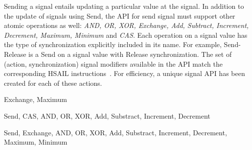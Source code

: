 \documentclass[draft]{book}
\begin{document}
Sending a signal entails updating a particular value at the signal. In addition
to the update of signals using Send, the API for send signal must support other
atomic operations as well: \emph {AND, OR, XOR, Exchange, Add, Subtract,
  Increment, Decrement, Maximum, Minimum} and \emph{CAS}. Each operation on a
signal value has the type of synchronization explicitly included in its
name. For example, Send-Release is a Send on a signal value with Release
synchronization. The set of (action, synchronization) signal modifiers available
in the API match the corresponding HSAIL instructions~\cite{prm}. For
efficiency, a unique signal API has been created for each of these actions.



\begin{description}[font=\it, leftmargin=1.5em]
\item[Acquire-Release synchronization] Exchange, Maximum
\item[Release synchronization] Send, CAS, AND, OR, XOR, Add, Substract, Increment, Decrement
\item[Relaxed synchronization] Send, Exchange, AND, OR, XOR, Add, Substract, Increment, Decrement, Maximum, Minimum
\end{description}
\end{document}
